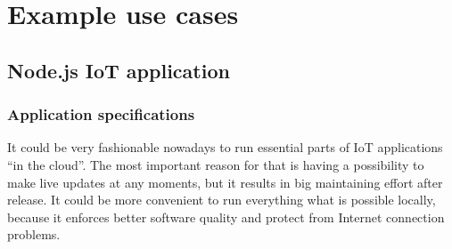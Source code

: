 \documentclass[printmode]{mgr}
\begin{document}



%
%
%
%
%
%
%
%
%
%
%

















\chapter{Example use cases}


\section{Node.js IoT application}

\subsection*{Application specifications}

It could be very fashionable nowadays to run essential parts of IoT applications ``in the cloud''.
The most important reason for that is having a possibility to make live updates at any moments, but it results in big maintaining effort after release.
It could be more convenient to run everything what is possible locally, because it enforces better software quality and protect from Internet connection problems.
\end{document}
